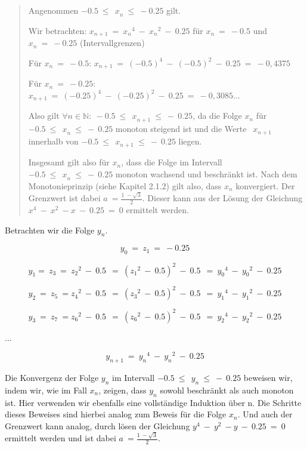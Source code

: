 \documentclass[a4paper, 12pt]{book}
\begin{document}
\begin{longtable}[]
\begin{minipage}[b]{\linewidth}
\begin{quote}
Angenommen \(- 0.5\ {\leq \ \ x}_{n}\  \leq \  - 0.25\) gilt.

Wir betrachten:
\(x_{n + 1}\  = \ {x_{n}}^{4}\  - \ {x_{n}}^{2}\  - \ 0.25\) für
\(x_{n}\  = \  - 0.5\) und \(x_{n}\  = \  - 0.25\) (Intervallgrenzen)

Für \(x_{n}\  = \  - 0.5\):
\(x_{n + 1}\  = \ {( - 0.5)}^{4}\  - \ {( - 0.5)}^{2}\  - \ 0.25\  = \  - 0,4375\)

Für \(x_{n}\  = \  - 0.25\):
\(x_{n + 1}\  = \ {( - 0.25)}^{4}\  - \ {( - 0.25)}^{2}\  - \ 0.25\  = \  - 0,3085...\)

Also gilt
\(\forall n \in \mathbb{N:\ } - 0.5\ {\leq \ \ x}_{n + 1}\  \leq \  - \ 0.25\),
da die Folge \(x_{n}\) für
\(- 0.5\ {\leq \ \ x}_{n}\  \leq \  - \ 0.25\) monoton steigend ist und
die Werte \({\ \ x}_{n + 1}\) innerhalb von
\(- 0.5\ {\leq \ \ x}_{n + 1}\  \leq \  - \ 0.25\) liegen.

Insgesamt gilt also für \(x_{n}\), dass die Folge im Intervall
\(- 0.5\ {\leq \ \ x}_{n}\  \leq \  - \ 0.25\) monoton wachsend und
beschränkt ist. Nach dem Monotonieprinzip (siehe Kapitel 2.1.2) gilt
also, dass \(x_{n}\) konvergiert. Der Grenzwert ist dabei
\(a\  = \frac{1\  - \sqrt{3}}{2}\). Dieser kann aus der Lösung der
Gleichung \(x^{4}\  - \ x^{2}\  - x\  - \ 0.25\  = \ 0\) ermittelt
werden.
\end{quote}

Betrachten wir die Folge \(y_{n}\).

\[y_{0}\  = \ z_{1}\  = \  - 0.25\]

\[y_{1}{= \ z}_{3}\  = \ {z_{2}}^{2}\  - \ 0.5\ \  = \ ({z_{1}}^{2}\  - \ 0.5)^{2}\  - \ 0.5\ \  = \ {y_{0}}^{4}\  - \ {y_{0}}^{2}\  - \ 0.25\]

\[y_{2}\  = \ z_{5}\  = {z_{4}}^{2}\  - \ 0.5\ \  = \ ({z_{3}}^{2}\  - \ 0.5)^{2}\  - \ 0.5\ \  = \ {y_{1}}^{4}\  - \ {y_{1}}^{2}\  - \ 0.25\]

\[y_{3}\  = \ z_{7}\  = {z_{6}}^{2}\  - \ 0.5\ \  = \ ({z_{6}}^{2}\  - \ 0.5)^{2}\  - \ 0.5\ \  = \ {y_{2}}^{4}\  - \ {y_{2}}^{2}\  - \ 0.25\]

...

\[y_{n + 1}\  = \ {y_{n}}^{4}\  - \ {y_{n}}^{2}\  - \ 0.25\]

Die Konvergenz der Folge \(y_{n}\) im Intervall
\(- 0.5\ {\leq \ \ y}_{n}\  \leq \  - \ 0.25\) beweisen wir, indem wir,
wie im Fall \(x_{n}\), zeigen, dass \(y_{n}\) sowohl beschränkt als auch
monoton ist. Hier verwenden wir ebenfalls eine vollständige Induktion
über n. Die Schritte dieses Beweises sind hierbei analog zum Beweis für
die Folge \(x_{n}\). Und auch der Grenzwert kann analog, durch lösen der
Gleichung \(y^{4}\  - \ y^{2}\  - y\  - \ 0.25\  = \ 0\) ermittelt
werden und ist dabei \(a\  = \frac{1\  - \sqrt{3}}{2}\).


\end{minipage}
\end{longtable}
\end{document}
